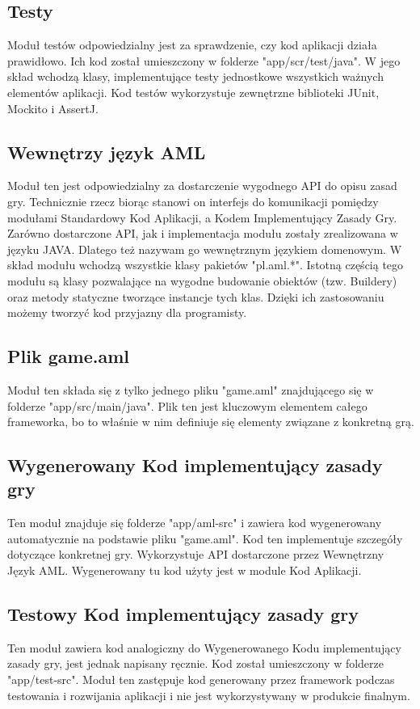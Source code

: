 \documentclass{xmgr}
\begin{document}
\subsection{Testy}
Moduł testów odpowiedzialny jest za sprawdzenie, czy kod aplikacji działa prawidłowo. Ich  kod został umieszczony w folderze "app/scr/test/java". W jego skład wchodzą klasy, implementujące testy jednostkowe wszystkich ważnych elementów aplikacji. Kod testów wykorzystuje zewnętrzne biblioteki JUnit, Mockito i AssertJ.

\subsection{Wewnętrzy język AML}
Moduł ten jest odpowiedzialny za dostarczenie wygodnego API do opisu zasad gry. Technicznie rzecz biorąc stanowi on interfejs do komunikacji pomiędzy modułami Standardowy Kod Aplikacji, a Kodem Implementujący Zasady Gry. Zarówno dostarczone API, jak i implementacja modułu zostały zrealizowana w języku JAVA. Dlatego też nazywam go wewnętrznym językiem domenowym. W skład modułu wchodzą wszystkie klasy pakietów "pl.aml.*".
Istotną częścią tego modułu są klasy pozwalające na wygodne budowanie obiektów (tzw. Buildery) oraz metody statyczne tworzące instancje tych klas. Dzięki ich zastosowaniu możemy tworzyć kod przyjazny dla programisty. 

\subsection{Plik game.aml}
Moduł ten składa się z tylko jednego pliku "game.aml" znajdującego się w folderze "app/src/main/java". Plik ten jest kluczowym elementem całego frameworka, bo to właśnie w nim definiuje się elementy związane z konkretną grą.

\subsection{Wygenerowany Kod implementujący zasady gry}
Ten moduł znajduje się folderze "app/aml-src" i zawiera kod wygenerowany automatycznie na podstawie pliku "game.aml". Kod ten implementuje szczegóły dotyczące konkretnej gry. Wykorzystuje API dostarczone przez Wewnętrzny Język AML. Wygenerowany tu kod użyty jest w module Kod Aplikacji.

\subsection{Testowy Kod implementujący zasady gry}
Ten moduł zawiera kod analogiczny do Wygenerowanego Kodu implementujący zasady gry, jest jednak napisany ręcznie. Kod został umieszczony w folderze "app/test-src". Moduł ten zastępuje kod generowany przez framework podczas testowania i rozwijania aplikacji i nie jest wykorzystywany w produkcie finalnym.
\end{document}
